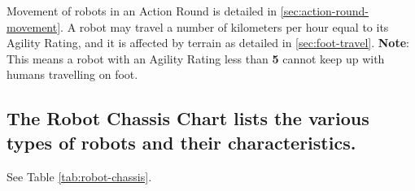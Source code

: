 Movement of robots in an Action Round is detailed in
\ref{sec:action-round-movement}.  A robot may travel a number of
kilometers per hour equal to its Agility Rating, and it is affected by
terrain as detailed in \ref{sec:foot-travel}. \textbf{Note}: This
means a robot with an Agility Rating less than \textbf{5} cannot keep
up with humans travelling on foot.

\subsection[Robot Chassis Chart]{The Robot Chassis Chart lists the
  various types of robots and their characteristics.}
\label{sec:robot-chassis-chart}

See Table \vref{tab:robot-chassis}.

%
%


